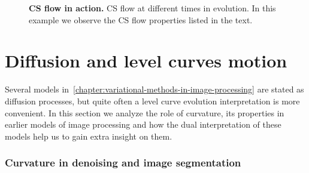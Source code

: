 \begin{figure}
\caption{\textbf{CS flow in action.} CS flow at different times in evolution. In this example we observe the CS flow properties listed in the text.}
\end{figure}



\section{Diffusion and level curves motion}
\label{ch3:sec:diffusion-level-curves-motion}

Several models in~\cref{chapter:variational-methods-in-image-processing} are stated as diffusion processes, but quite often a level curve evolution interpretation is more convenient. In this section we analyze the role of curvature, its properties in earlier models of image processing and how the dual interpretation of these models help us to gain extra insight on them.

\subsubsection{Curvature in denoising and image segmentation}


